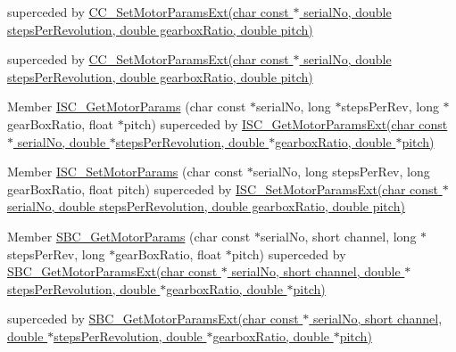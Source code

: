 superceded by \hyperlink{group___t_cube_d_c_servo_ga8231c0203d1e6fdf08b58bfc47646241}{C\+C\+\_\+\+Set\+Motor\+Params\+Ext(char const $\ast$ serial\+No, double steps\+Per\+Revolution, double gearbox\+Ratio, double pitch)} 

superceded by \hyperlink{group___t_cube_d_c_servo_ga8231c0203d1e6fdf08b58bfc47646241}{C\+C\+\_\+\+Set\+Motor\+Params\+Ext(char const $\ast$ serial\+No, double steps\+Per\+Revolution, double gearbox\+Ratio, double pitch)} 

\label{deprecated__deprecated000023}%
\hypertarget{deprecated__deprecated000023}{}%
Member \hyperlink{group___integrated_stepper_motors_gac4dd8c0ef207436086d2efb0982ceaee}{I\+S\+C\+\_\+\+Get\+Motor\+Params} (char const $\ast$serial\+No, long $\ast$steps\+Per\+Rev, long $\ast$gear\+Box\+Ratio, float $\ast$pitch) superceded by \hyperlink{group___integrated_stepper_motors_ga405ad4d537cb95299c03be1a0bec90c3}{I\+S\+C\+\_\+\+Get\+Motor\+Params\+Ext(char const $\ast$ serial\+No, double $\ast$steps\+Per\+Revolution, double $\ast$gearbox\+Ratio, double $\ast$pitch)} 

\label{deprecated__deprecated000022}%
\hypertarget{deprecated__deprecated000022}{}%
Member \hyperlink{group___integrated_stepper_motors_ga98acb152da072d4e825ab80045b6b0ca}{I\+S\+C\+\_\+\+Set\+Motor\+Params} (char const $\ast$serial\+No, long steps\+Per\+Rev, long gear\+Box\+Ratio, float pitch) superceded by \hyperlink{group___integrated_stepper_motors_gae88d77585ffcb0874667cb4001292b0a}{I\+S\+C\+\_\+\+Set\+Motor\+Params\+Ext(char const $\ast$ serial\+No, double steps\+Per\+Revolution, double gearbox\+Ratio, double pitch)} 

\label{deprecated__deprecated000004}%
\hypertarget{deprecated__deprecated000004}{}%
Member \hyperlink{group___benchtop_stepper_ga5744ff3b1510ede13ed02dd290f9e657}{S\+B\+C\+\_\+\+Get\+Motor\+Params} (char const $\ast$serial\+No, short channel, long $\ast$steps\+Per\+Rev, long $\ast$gear\+Box\+Ratio, float $\ast$pitch) superceded by \hyperlink{group___modular_stepper_gad8a39815a5cab6b1f88b481b1a5cd974}{S\+B\+C\+\_\+\+Get\+Motor\+Params\+Ext(char const $\ast$ serial\+No, short channel, double $\ast$steps\+Per\+Revolution, double $\ast$gearbox\+Ratio, double $\ast$pitch)} 

superceded by \hyperlink{group___modular_stepper_gad8a39815a5cab6b1f88b481b1a5cd974}{S\+B\+C\+\_\+\+Get\+Motor\+Params\+Ext(char const $\ast$ serial\+No, short channel, double $\ast$steps\+Per\+Revolution, double $\ast$gearbox\+Ratio, double $\ast$pitch)} 

